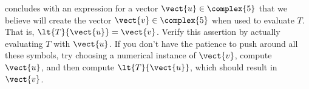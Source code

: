  concludes with an expression for a vector $\vect{u}\in\complex{5}$ that we believe will create the vector $\vect{v}\in\complex{5}$ when used to evaluate $T$.  That is, $\lt{T}{\vect{u}}=\vect{v}$.  Verify this assertion by actually evaluating $T$ with $\vect{u}$.  If you don't have the patience to push around all these symbols, try choosing a numerical instance of $\vect{v}$, compute $\vect{u}$, and then compute $\lt{T}{\vect{u}}$, which should result in $\vect{v}$.